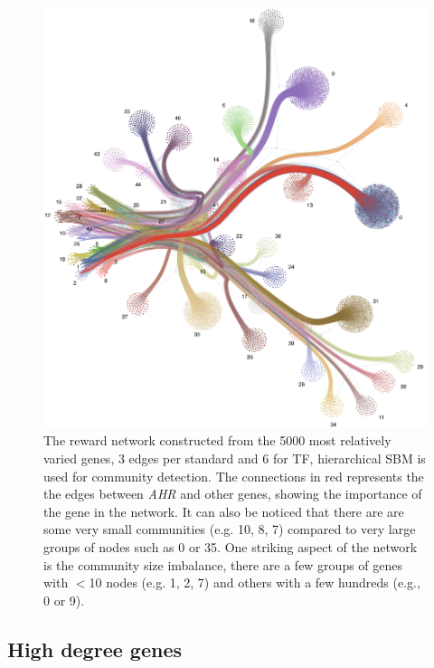 
\begin{figure}[H]    
    \centering
    \includegraphics[width=1.0\textwidth,height=1.0\textheight,keepaspectratio]{Sections/Network_II/resources/reward/sigmoid_5K_Net_II_label_2.png}
    \caption[Reward network]{The reward network constructed from the 5000 most relatively varied genes, 3 edges per standard and 6 for TF, hierarchical SBM is used for community detection. The connections in red represents the the edges between \textit{AHR} and other genes, showing the importance of the gene in the network. It can also be noticed that there are are some very small communities (e.g. 10, 8, 7) compared to very large groups of nodes such as 0 or 35. One striking aspect of the network is the community size imbalance, there are a few groups of genes with $<$10 nodes (e.g. 1, 2, 7) and others with a few hundreds (e.g., 0 or 9).}
    \label{fig:N_II:reward_net}
\end{figure}


\subsection{High degree genes} \label{s:N_II:high_conn}

